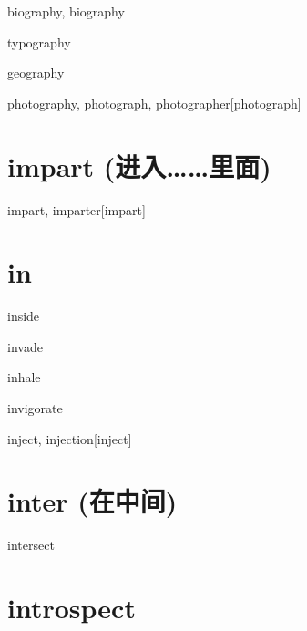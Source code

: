 \begin{RefWord}{biography, biography}
\end{RefWord}

\begin{RefWord}{typography}
\end{RefWord}

\begin{RefWord}{geography}
\end{RefWord}

\begin{RefWord}{photography, photograph, photographer}[photograph]
\end{RefWord}


\section{impart (进入……里面)}
\begin{RefWord}{impart, imparter}[impart]
\end{RefWord}

\section{in}

\begin{RefWord}{inside}
\end{RefWord}

\begin{RefWord}{invade}
\end{RefWord}

\begin{RefWord}{inhale}
\end{RefWord}

\begin{DefWord}{invigorate}
\end{DefWord}

\begin{RefWord}{inject, injection}[inject]
\end{RefWord}

\section{inter (在中间)}

\begin{RefWord}{intersect}
\end{RefWord}

\section{introspect}

